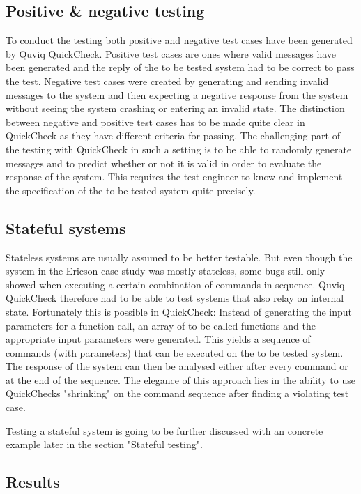 \documentclass[a4paper, 12pt]{article} %
\begin{document}
\subsection{Positive \& negative testing}

To conduct the testing both positive and negative test cases have been generated by Quviq QuickCheck. Positive test cases are ones where valid messages have been generated and the reply of the to be tested system had to be correct to pass the test. Negative test cases were created by generating and sending invalid messages to the system and then expecting a negative response from the system without seeing the system crashing or entering an invalid state. The distinction between negative and positive test cases has to be made quite clear in QuickCheck as they have different criteria for passing. The challenging part of the testing with QuickCheck in such a setting is to be able to randomly generate messages and to predict whether or not it is valid in order to evaluate the response of the system. This requires the test engineer to know and implement the specification of the to be tested system quite precisely. \cite{Arts06}

\subsection{Stateful systems}

Stateless systems are usually assumed to be better testable. But even though the system in the Ericson case study was mostly stateless, some bugs still only showed when executing a certain combination of commands in sequence. Quviq QuickCheck therefore had to be able to test systems that also relay on internal state. Fortunately this is possible in QuickCheck: Instead of generating the input parameters for a function call, an array of to be called functions and the appropriate input parameters were generated. This yields a sequence of commands (with parameters) that can be executed on the to be tested system. The response of the system can then be analysed either after every command or at the end of the sequence. The elegance of this approach lies in the ability to use QuickChecks "shrinking" on the command sequence after finding a violating test case. \cite{Arts06} 

Testing a stateful system is going to be further discussed with an concrete example later in the section "Stateful testing".

\subsection{Results}
\end{document}
